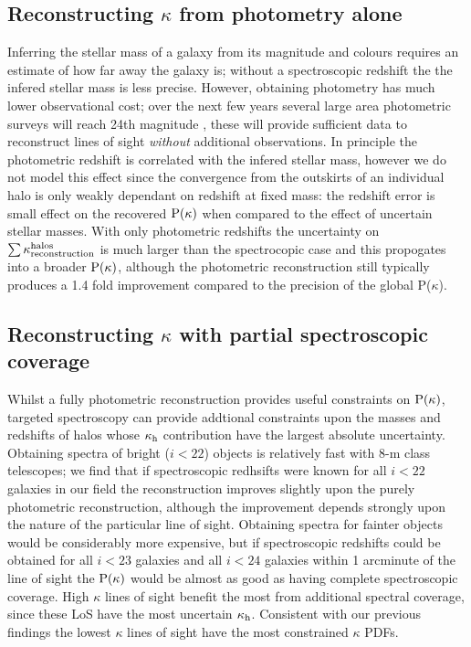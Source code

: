 \documentclass[useAMS,usenatbib]{mn2e}
\begin{document}
\subsection{Reconstructing $\kappa$ from photometry alone}

Inferring the stellar mass of a galaxy from its magnitude and colours requires an estimate of how far away the galaxy is; without a spectroscopic redshift the the infered stellar mass is less precise. However, obtaining photometry has much lower observational cost; over the next few years several large area photometric surveys will reach 24th magnitude \citep{EUCLID,LSST}, these will provide sufficient data to reconstruct lines of sight {\it without} additional observations. In principle the photometric redshift is correlated with the infered stellar mass, however we do not model this effect since the convergence from the outskirts of an individual halo is only weakly dependant on redshift at fixed mass: the redshift error is small effect on the recovered ${\rm P}(\kappa)$ when compared to the effect of uncertain stellar masses.  With only photometric redshifts the uncertainty on $\sum\kappa_{\rm reconstruction}^{\rm halos}$ is much larger than the spectrocopic case and this propogates into a broader ${\rm P}(\kappa)$, although the photometric reconstruction still typically produces a 1.4 fold improvement compared to the precision of the global P($\kappa$).

\subsection{Reconstructing $\kappa$ with partial spectroscopic coverage}

Whilst a fully photometric reconstruction provides useful constraints on ${\rm P}(\kappa)$, targeted spectroscopy can provide addtional constraints upon the masses and redshifts of halos whose $\kappa_{\rm h}$ contribution have the largest absolute uncertainty. Obtaining spectra of bright ($i<22$) objects is relatively fast with 8-m class telescopes; we find that if spectroscopic redhsifts were known for all $i<22$ galaxies in our field the reconstruction improves slightly upon the purely photometric reconstruction, although the improvement depends strongly upon the nature of the particular line of sight. Obtaining spectra for fainter objects would be considerably more expensive, but if spectroscopic redshifts could be obtained for all $i<23$ galaxies and all $i<24$ galaxies within 1 arcminute of the line of sight the ${\rm P}(\kappa)$ would be almost as good as having complete spectroscopic coverage. High $\kappa$ lines of sight benefit the most from additional spectral coverage, since these LoS have the most uncertain $\kappa_{\rm h}$. Consistent with our previous findings the lowest $\kappa$ lines of sight have the most constrained $\kappa$ PDFs.
\end{document}
